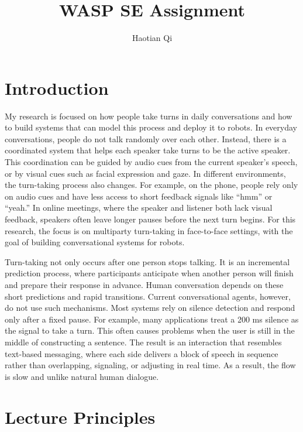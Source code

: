 \documentclass[11pt]{article}
\title{WASP SE Assignment}
\author{Haotian Qi}
\begin{document}
\maketitle

\section{Introduction}
My research is focused on how people take turns in daily conversations and how to build systems that can model this process and deploy it to robots. In everyday conversations, people do not talk randomly over each other. Instead, there is a coordinated system that helps each speaker take turns to be the active speaker. This coordination can be guided by audio cues from the current speaker’s speech, or by visual cues such as facial expression and gaze. In different environments, the turn-taking process also changes. For example, on the phone, people rely only on audio cues and have less access to short feedback signals like “hmm” or “yeah.” In online meetings, where the speaker and listener both lack visual feedback, speakers often leave longer pauses before the next turn begins. For this research, the focus is on multiparty turn-taking in face-to-face settings, with the goal of building conversational systems for robots.



Turn-taking not only occurs after one person stops talking. It is an incremental prediction process, where participants anticipate when another person will finish and prepare their response in advance. Human conversation depends on these short predictions and rapid transitions. Current conversational agents, however, do not use such mechanisms. Most systems rely on silence detection and respond only after a fixed pause. For example, many applications treat a 200 ms silence as the signal to take a turn. This often causes problems when the user is still in the middle of constructing a sentence. The result is an interaction that resembles text-based messaging, where each side delivers a block of speech in sequence rather than overlapping, signaling, or adjusting in real time. As a result, the flow is slow and unlike natural human dialogue.

\section{Lecture Principles}
\end{document}
